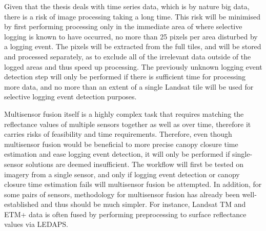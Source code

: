 \documentclass[a4paper,10pt]{article}
\begin{document}
Given that the thesis deals with time series data, which is by nature big data, there is a risk of image processing taking a long time. This risk will be minimised by first performing processing only in the immediate area of where selective logging is known to have occurred, no more than 25 pixels per area disturbed by a logging event. The pixels will be extracted from the full tiles, and will be stored and processed separately, as to exclude all of the irrelevant data outside of the logged areas and thus speed up processing. The previously unknown logging event detection step will only be performed if there is sufficient time for processing more data, and no more than an extent of a single Landsat tile will be used for selective logging event detection purposes.

Multisensor fusion itself is a highly complex task that requires matching the reflectance values of multiple sensors together as well as over time, therefore it carries risks of feasibility and time requirements. Therefore, even though multisensor fusion would be beneficial to more precise canopy closure time estimation and ease logging event detection, it will only be performed if single-sensor solutions are deemed insufficient. The workflow will first be tested on imagery from a single sensor, and only if logging event detection or canopy closure time estimation fails will multisensor fusion be attempted. In addition, for some pairs of sensors, methodology for multisensor fusion has already been well-established and thus should be much simpler. For instance, Landsat TM and ETM+ data is often fused by performing preprocessing to surface reflectance values via LEDAPS.

\printnoidxglossary[type=acronym]


\end{document}
